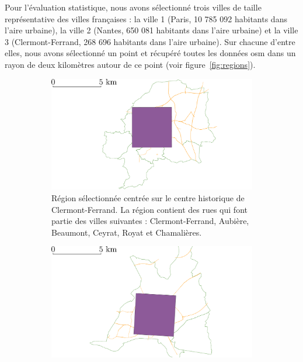 Pour l'évaluation statistique, nous avons sélectionné trois villes de taille représentative des villes françaises : la ville 1 (Paris, 10 785 092 habitants dans l'aire urbaine), la ville 2 (Nantes, 650 081 habitants dans l'aire urbaine) et la ville 3 (Clermont-Ferrand, 268 696 habitants dans l'aire urbaine). Sur chacune d'entre elles, nous avons sélectionné un point et récupéré toutes les données \gls{osm} dans un rayon de deux kilomètres autour de ce point (voir figure~\ref{fig:regions}).

\newpar{}

\begin{figure}[ht]
    \centering
    \begin{subfigure}[t]{0.49\linewidth}
        \includegraphics[width=\textwidth]{images/evaluation/crseg/clermont.pdf}
        \caption{Région sélectionnée centrée sur le centre historique de Clermont-Ferrand. La région contient des rues qui font partie des villes suivantes : Clermont-Ferrand, Aubière, Beaumont, Ceyrat, Royat et Chamalières.\label{fig:clermontRegion}}
    \end{subfigure}
    \begin{subfigure}[t]{0.49\linewidth}
        \includegraphics[width=\textwidth]{images/evaluation/crseg/nantes.pdf}

\end{subfigure}
\end{figure}
